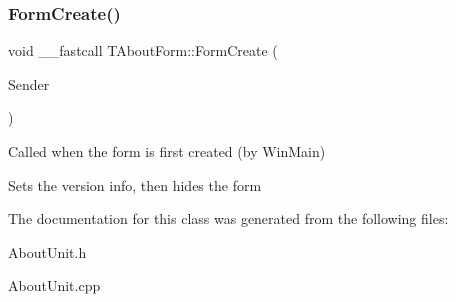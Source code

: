 \subsubsection{\texorpdfstring{Form\+Create()}{FormCreate()}}
{\footnotesize\ttfamily void \+\_\+\+\_\+fastcall T\+About\+Form\+::\+Form\+Create (\begin{DoxyParamCaption}\item[{T\+Object $\ast$}]{Sender }\end{DoxyParamCaption})}

Called when the form is first created (by Win\+Main)

Sets the version info, then hides the form 

The documentation for this class was generated from the following files\+:\begin{DoxyCompactItemize}
\item 
About\+Unit.\+h\item 
About\+Unit.\+cpp\end{DoxyCompactItemize}
